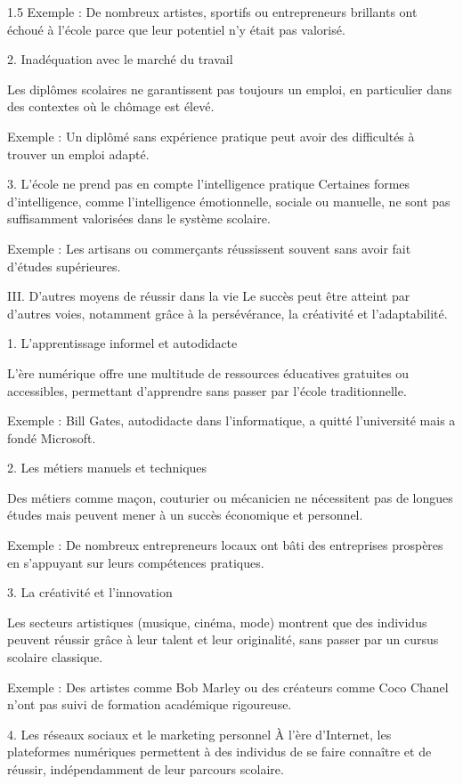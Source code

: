 \documentclass[12pt]{article}
\begin{document}
\begin{spacing}{1.5}
Exemple : De nombreux artistes, sportifs ou entrepreneurs brillants ont échoué à l'école parce que leur potentiel n'y était pas valorisé.

2. Inadéquation avec le marché du travail

Les diplômes scolaires ne garantissent pas toujours un emploi, en particulier dans des contextes où le chômage est élevé.

Exemple : Un diplômé sans expérience pratique peut avoir des difficultés à trouver un emploi adapté.

3. L'école ne prend pas en compte l'intelligence pratique
Certaines formes d'intelligence, comme l'intelligence émotionnelle, sociale ou manuelle, ne sont pas suffisamment valorisées dans le système scolaire.

Exemple : Les artisans ou commerçants réussissent souvent sans avoir fait d'études supérieures.

\quad
III. D'autres moyens de réussir dans la vie
Le succès peut être atteint par d'autres voies, notamment grâce à la persévérance, la créativité et l'adaptabilité.

1. L'apprentissage informel et autodidacte

L'ère numérique offre une multitude de ressources éducatives gratuites ou accessibles, permettant d'apprendre sans passer par l'école traditionnelle.

Exemple : Bill Gates, autodidacte dans l'informatique, a quitté l'université mais a fondé Microsoft.

2. Les métiers manuels et techniques

Des métiers comme maçon, couturier ou mécanicien ne nécessitent pas de longues études mais peuvent mener à un succès économique et personnel.

Exemple : De nombreux entrepreneurs locaux ont bâti des entreprises prospères en s'appuyant sur leurs compétences pratiques.

3. La créativité et l'innovation

Les secteurs artistiques (musique, cinéma, mode) montrent que des individus peuvent réussir grâce à leur talent et leur originalité, sans passer par un cursus scolaire classique.

Exemple : Des artistes comme Bob Marley ou des créateurs comme Coco Chanel n'ont pas suivi de formation académique rigoureuse.

4. Les réseaux sociaux et le marketing personnel
À l'ère d'Internet, les plateformes numériques permettent à des individus de se faire connaître et de réussir, indépendamment de leur parcours scolaire.


\end{spacing}
\end{document}
